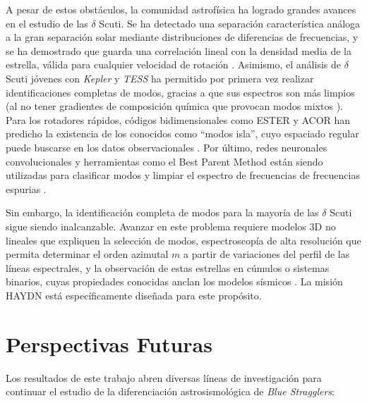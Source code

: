A pesar de estos obstáculos, la comunidad astrofísica ha logrado grandes avances en el estudio de las $\delta$ Scuti. Se ha detectado una separación característica análoga a la gran separación solar mediante distribuciones de diferencias de frecuencias, y se ha demostrado que guarda una correlación lineal con la densidad media de la estrella, válida para cualquier velocidad de rotación \citep{Garcia_Hernandez_2015, Suarez_2014}. Asimismo, el análisis de $\delta$ Scuti jóvenes con \textit{Kepler} y \textit{TESS} ha permitido por primera vez realizar identificaciones completas de modos, gracias a que sus espectros son más limpios (al no tener gradientes de composición química que provocan modos mixtos \citep{Guzik_2021}). Para los rotadores rápidos, códigos bidimensionales como \textsc{ESTER} y \textsc{ACOR} han predicho la existencia de los conocidos como ``modos isla'', cuyo espaciado regular puede buscarse en los datos observacionales \citep{Ouazzani_2015,10.3389/fspas.2022.952296}. Por último, redes neuronales convolucionales y herramientas como el Best Parent Method están siendo utilizadas para clasificar modos y limpiar el espectro de frecuencias de frecuencias espurias \citep{10.3389/fspas.2022.952296}.

Sin embargo, la identificación completa de modos para la mayoría de las $\delta$ Scuti sigue siendo inalcanzable. Avanzar en este problema requiere modelos 3D no lineales que expliquen la selección de modos, espectroscopía de alta resolución que permita determinar el orden azimutal $m$ a partir de variaciones del perfil de las líneas espectrales, y la observación de estas estrellas en cúmulos o sistemas binarios, cuyas propiedades conocidas anclan los modelos sísmicos \citep{10.3389/fspas.2022.952296,Guzik_2021}. La misión HAYDN está específicamente diseñada para este propósito.

\section{Perspectivas Futuras}

Los resultados de este trabajo abren diversas líneas de investigación para continuar el estudio de la diferenciación astrosismológica de \textit{Blue Stragglers}:

